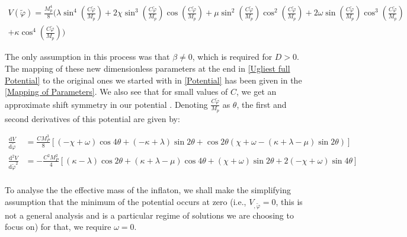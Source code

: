 \documentclass[aps,prd,reprint,preprintnumbers,showpacs,floatfix,nofootinbib,superscript address]{revtex4-2}
\newcommand{\wb}[1]{{\color[RGB]{255,0,0}{\textbf{\textit{[WB: #1]}}}}}
\begin{document}
\begin{widetext}
    \begin{equation} 
    \begin{aligned} \label{Ugliest full Potential}
        V(\tilde{\varphi}) =  \frac{M_p^4}{8} \Bigg(\lambda \sin^4\left( \frac{C \tilde{\varphi}}{M_p}\right) + 2 \chi \sin^3\left( \frac{C \tilde{\varphi}}{M_p}\right) \cos\left( \frac{C \tilde{\varphi}}{M_p}\right)  + \mu \sin^2\left( \frac{C \tilde{\varphi}}{M_p}\right) \cos^2\left( \frac{C \tilde{\varphi}}{M_p}\right) + 2\omega \sin\left( \frac{C \tilde{\varphi}}{M_p}\right) \cos^3\left( \frac{C \tilde{\varphi}}{M_p}\right)  \\ + \kappa \cos^4\left( \frac{C \tilde{\varphi}}{M_p}\right) \Bigg)
    \end{aligned}
\end{equation}
\end{widetext}
The only assumption in this process was that $\beta \neq 0$, which is required for $D > 0$. The mapping of these new dimensionless parameters at the end in \cref{Ugliest full Potential} to the original ones we started with in \cref{Potential} has been given in the \cref{Mapping of Parameters}. We also see that for small values of $C$, we get an approximate shift symmetry in our potential \cite{finelli_effective_2018}\wb{What does this mean?}. Denoting $\frac{C\tilde{\varphi}}{M_p}$ as $\theta$, the first and second derivatives of this potential are given by:
\begin{widetext}
    \begin{equation} 
    \begin{aligned} \label{Derivatives of Pot}
    \frac{\text{d}V}{\text{d}\tilde{\varphi}} &= \frac{CM_P^3}{8} \left[ (-\chi + \omega) \cos4\theta + (-\kappa + \lambda) \sin2\theta + \cos2\theta (\chi + \omega - (\kappa + \lambda - \mu ) 
    \sin2\theta) \right] \nonumber \\
    \frac{\text{d}^2V}{\text{d}\tilde{\varphi}^2} &= -\frac{C^2M_P^2}{4} \left[ (\kappa - \lambda) \cos2\theta + (\kappa + \lambda - \mu) \cos4\theta + (\chi+\omega) \sin2\theta + 2(-\chi + \omega) \sin4\theta \right]  \\
    \end{aligned}
\end{equation}
\end{widetext}
To analyse the the effective mass of the inflaton, we shall make the simplifying assumption that the minimum of the potential occurs at zero (i.e., $V_{,\tilde{\varphi}} = 0$, this is not a general analysis and is a particular regime of solutions we are choosing to focus on) for that, we require $\omega = 0$.
\end{document}
